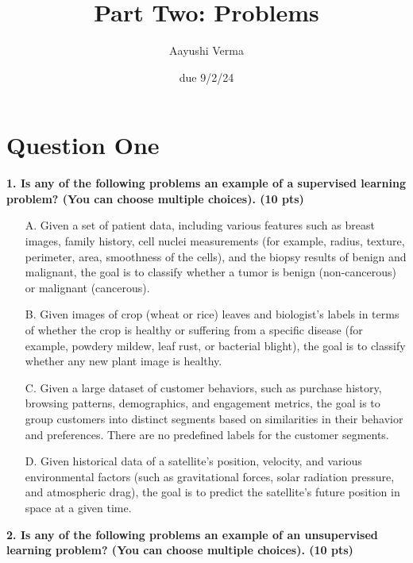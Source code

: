 \documentclass{article}
\title{Part Two: Problems}
\author{Aayushi Verma}
\date{due 9/2/24}
\begin{document}
\maketitle

\section*{Question One}
\textbf{1. Is any of the following problems an example of a supervised learning problem? (You can choose multiple choices). (10 pts)}

\begin{itemize}
    \item[A.] Given a set of patient data, including various features such as breast images, family history, cell nuclei measurements (for example, radius, texture, perimeter, area, smoothness of the cells), and the biopsy results of benign and malignant, the goal is to classify whether a tumor is benign (non-cancerous) or malignant (cancerous).
    \item[B.] Given images of crop (wheat or rice) leaves and biologist’s labels in terms of whether the crop is healthy or suffering from a specific disease (for example, powdery mildew, leaf rust, or bacterial blight), the goal is to classify whether any new plant image is healthy.
    \item[C.] Given a large dataset of customer behaviors, such as purchase history, browsing patterns, demographics, and engagement metrics, the goal is to group customers into distinct segments based on similarities in their behavior and preferences. There are no predefined labels for the customer segments.
    \item[D.] Given historical data of a satellite's position, velocity, and various environmental factors (such as gravitational forces, solar radiation pressure, and atmospheric drag), the goal is to predict the satellite's future position in space at a given time.
\end{itemize}


\textbf{2. Is any of the following problems an example of an unsupervised learning problem? (You can choose multiple choices). (10 pts)}
\end{document}
